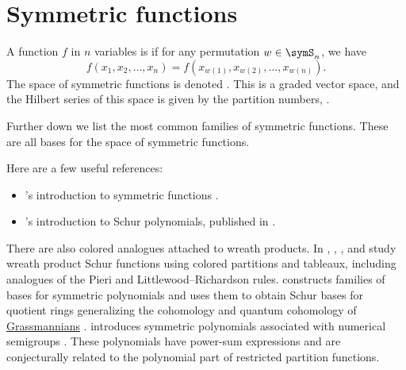 


\section[symmetricFunctions]{Symmetric functions}


A function $f$ in $n$ variables is \label{symmetricFunction}
if for any permutation $w\in \symS_n$,
we have
\[
 f(x_1,x_2,\dotsc,x_n) = f(x_{w(1)},x_{w(2)},\dotsc,x_{w(n)}).
\]
The space of symmetric functions is denoted \label{spaceSym}.
This is a graded vector space, and the Hilbert series of this space is given
by the partition numbers, .

Further down we list the most common families of symmetric functions.
These are all bases for the space of symmetric functions.

Here are a few useful references:
\begin{itemize}
\item {}'s introduction to symmetric functions
\cite{Zabrocki2003}.
\item {}'s introduction to Schur polynomials, published
in \cite{Prasad2019}.
\end{itemize}

There are also colored analogues attached to wreath products.  In
\cite{IngramJingStitzinger2008x}, , ,
and  study wreath product Schur functions using colored
partitions and tableaux, including analogues of the Pieri and
Littlewood--Richardson rules.
 constructs families of bases for symmetric polynomials
and uses them to obtain Schur bases for quotient rings generalizing the
cohomology and quantum cohomology of
\hyperref[grassmannianVarieties]{Grassmannians} \cite{Weinfeld2019x}.
 introduces symmetric polynomials associated with
numerical semigroups \cite{Fel2021NumericalSemigroupSymmetric}.  These
polynomials have power-sum expressions and are conjecturally related to the
polynomial part of restricted partition functions.

